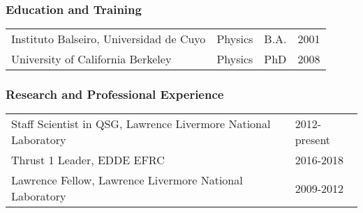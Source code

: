 \subsubsection*{Education and Training}

\begin{table}[ht]
    \centering
\begin{tabular}{llll} 
Instituto Balseiro, Universidad de Cuyo& Physics & B.A. & 2001 \\ 
University of California Berkeley & Physics & PhD & 2008 \\
\end{tabular}
\end{table}

\subsubsection*{Research and Professional Experience}
\begin{table}[ht]
\centering
\begin{tabular}{ll} 
Staff Scientist in QSG, Lawrence Livermore National Laboratory & 2012-present\\
Thrust 1 Leader, EDDE EFRC & 2016-2018 \\
Lawrence Fellow, Lawrence Livermore National Laboratory & 2009-2012 \\
\end{tabular}
\end{table}

